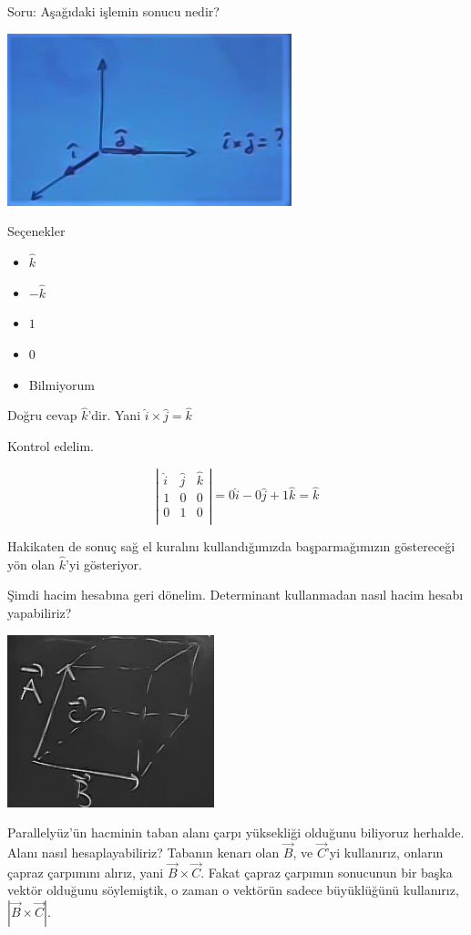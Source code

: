 \documentclass[12pt,fleqn]{article}\usepackage{../../common}
\begin{document}
Soru: Aşağıdaki işlemin sonucu nedir?

\includegraphics[height=5cm]{2_12.png}

Seçenekler
\begin{itemize}
   \item $\hat{k}$
   \item $-\hat{k}$
   \item $1$
   \item $0$
   \item Bilmiyorum
\end{itemize}

Doğru cevap $\hat{k}$'dir. Yani $\hat{i} \times \hat{j} = \hat{k}$

Kontrol edelim. 

$$ 
\left|\begin{array}{rrr}
\hat{i}& \hat{j}& \hat{k} \\
1 & 0 & 0 \\
0 & 1 & 0 \\
\end{array}\right| = 
0 \hat{i} - 0 \hat{j} + 1 \hat{k}  = 
\hat{k}
 $$

Hakikaten de sonuç sağ el kuralını kullandığımızda başparmağımızın göstereceği
yön olan $\hat{k}$'yi gösteriyor.

Şimdi hacim hesabına geri dönelim. Determinant kullanmadan nasıl hacim hesabı
yapabiliriz?

\includegraphics[height=5cm]{2_13.png}

Parallelyüz'ün hacminin taban alanı çarpı yüksekliği olduğunu biliyoruz
herhalde. Alanı nasıl hesaplayabiliriz? Tabanın kenarı olan $\vec{B}$, ve
$\vec{C}$'yi kullanırız, onların çapraz çarpımını alırız, yani $\vec{B}\times
\vec{C}$. Fakat çapraz çarpımın sonucunun bir başka vektör olduğunu söylemiştik,
o zaman o vektörün sadece büyüklüğünü kullanırız, $|\vec{B}\times \vec{C}|$.
\end{document}

